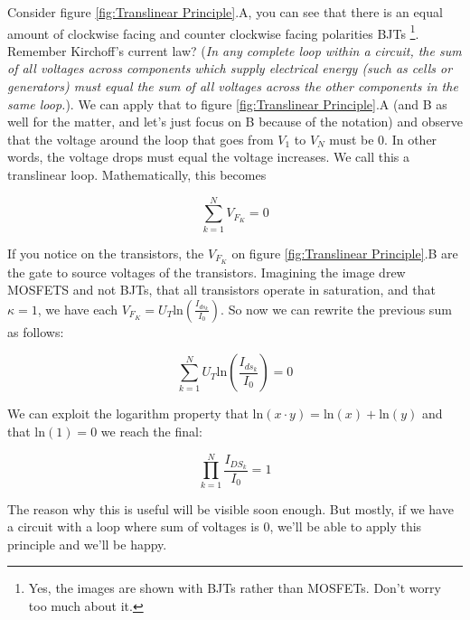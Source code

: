 Consider figure \ref{fig:Translinear Principle}.A, you can see that there is an equal amount of clockwise facing and counter clockwise facing polarities BJTs \footnote{Yes, the images are shown with BJTs rather than MOSFETs. Don't worry too much about it.}. Remember Kirchoff's current law? (\textit{In any complete loop within a circuit, the sum of all voltages across components which supply electrical energy (such as cells or generators) must equal the sum of all voltages across the other components in the same loop.}). We can apply that to figure \ref{fig:Translinear Principle}.A (and B as well for the matter, and let's just focus on B because of the notation) and observe that the voltage around the loop that goes from $V_{1}$ to $V_{N}$ must be 0. In other words, the voltage drops must equal the voltage increases. We call this a translinear loop. Mathematically, this becomes

\begin{equation}
    \sum_{k=1}^{N} V_{F_K} = 0
\end{equation}

If you notice on the transistors, the $V_{F_K}$  on figure \ref{fig:Translinear Principle}.B are the gate to source voltages of the transistors. Imagining the image drew MOSFETS and not BJTs, that all transistors operate in saturation, and that $\kappa = 1$, we have each $V_{F_K} = U_T \mathrm{ln}(\frac{I_{ds_k}}{I_0})$. So now we can rewrite the previous sum as follows: 

\begin{equation}
    \sum_{k=1}^{N} {U_T \mathrm{ln}(\frac{I_{ds_k}}{I_0})} = 0
\end{equation}

We can exploit the logarithm property that $\mathrm{ln}(x \cdot y) = \mathrm{ln}(x) + \mathrm{ln}(y)$ and that ln$(1) = 0$  we reach the final: 

\begin{equation}
    \prod_{k=1}^{N} \frac{I_{DS_k}}{I_0} = 1
\end{equation}

The reason why this is useful will be visible soon enough. But mostly, if we have a circuit with a loop where sum of voltages is 0, we'll be able to apply this principle and we'll be happy.


